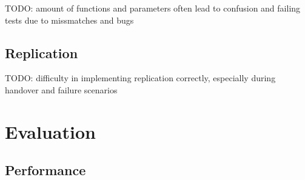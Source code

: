 \documentclass[a4paper, 11pt]{article}
\begin{document}
TODO: amount of functions and parameters often lead to confusion and failing tests due to missmatches and bugs

\subsection{Replication}

TODO: difficulty in implementing replication correctly, especially during handover and failure scenarios

\section{Evaluation}

\subsection{Performance}
\end{document}
